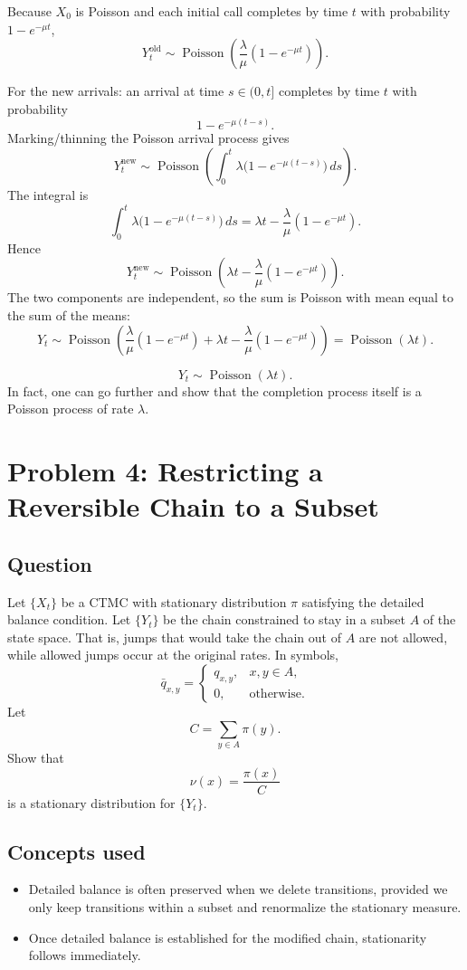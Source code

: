 \documentclass[11pt,a4paper]{article}
\newcommand{\Pois}{\operatorname{Poisson}}
\newcommand{\1}{\mathbf{1}}
\begin{document}
Because $X_0$ is Poisson and each initial call completes by time $t$ with probability $1-e^{-\mu t}$,
\[
Y_t^{\text{old}}\sim \Pois\!\left(\frac{\lambda}{\mu}(1-e^{-\mu t})\right).
\]

For the new arrivals: an arrival at time $s\in(0,t]$ completes by time $t$ with probability
\[
1-e^{-\mu(t-s)}.
\]
Marking/thinning the Poisson arrival process gives
\[
Y_t^{\text{new}}\sim \Pois\!\left(\int_0^t \lambda\bigl(1-e^{-\mu(t-s)}\bigr)\,ds\right).
\]
The integral is
\[
\int_0^t \lambda\bigl(1-e^{-\mu(t-s)}\bigr)\,ds
=\lambda t-\frac{\lambda}{\mu}(1-e^{-\mu t}).
\]
Hence
\[
Y_t^{\text{new}}\sim \Pois\!\left(\lambda t-\frac{\lambda}{\mu}(1-e^{-\mu t})\right).
\]
The two components are independent, so the sum is Poisson with mean equal to the sum of the means:
\[
Y_t\sim \Pois\!\left(\frac{\lambda}{\mu}(1-e^{-\mu t})
+\lambda t-\frac{\lambda}{\mu}(1-e^{-\mu t})\right)
=\Pois(\lambda t).
\]

\[
\boxed{Y_t\sim \Pois(\lambda t).}
\]
In fact, one can go further and show that the completion process itself is a Poisson process of rate $\lambda$.

\section{Problem 4: Restricting a Reversible Chain to a Subset}
\subsection*{Question}
Let $\{X_t\}$ be a CTMC with stationary distribution $\pi$ satisfying the detailed balance condition. Let $\{Y_t\}$ be the chain constrained to stay in a subset $A$ of the state space. That is, jumps that would take the chain out of $A$ are not allowed, while allowed jumps occur at the original rates. In symbols,
\[
\bar q_{x,y}=
\begin{cases}
q_{x,y}, & x,y\in A,\\
0, & \text{otherwise.}
\end{cases}
\]
Let
\[
C=\sum_{y\in A}\pi(y).
\]
Show that
\[
\nu(x)=\frac{\pi(x)}{C}
\]
is a stationary distribution for $\{Y_t\}$.

\subsection*{Concepts used}
\begin{itemize}
  \item Detailed balance is often preserved when we delete transitions, provided we only keep transitions within a subset and renormalize the stationary measure.
  \item Once detailed balance is established for the modified chain, stationarity follows immediately.
\end{itemize}
\end{document}
